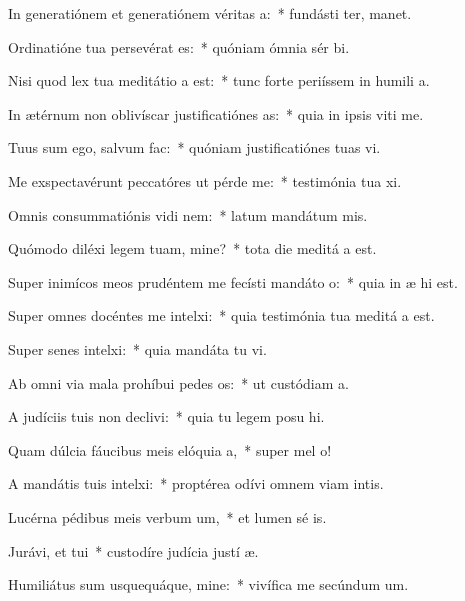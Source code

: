 \item In generatiónem et generatiónem véritas a:~* fundásti ter,  manet.
\item Ordinatióne tua persevérat es:~* quóniam ómnia sér bi.
\item Nisi quod lex tua meditátio a est:~* tunc forte periíssem in humili a.
\item In ætérnum non oblivíscar justificatiónes as:~* quia in ipsis viti me.
\item Tuus sum ego, salvum  fac:~* quóniam justificatiónes tuas vi.
\item Me exspectavérunt peccatóres ut pérde me:~* testimónia tua xi.
\item Omnis consummatiónis vidi nem:~* latum mandátum  mis.
\item Quómodo diléxi legem tuam, mine?~* tota die meditá a est.
\item Super inimícos meos prudéntem me fecísti mandáto o:~* quia in æ hi est.
\item Super omnes docéntes me intelxi:~* quia testimónia tua meditá a est.
\item Super senes intelxi:~* quia mandáta tu vi.
\item Ab omni via mala prohíbui pedes os:~* ut custódiam  a.
\item A judíciis tuis non declivi:~* quia tu legem posu hi.
\item Quam dúlcia fáucibus meis elóquia a,~* super mel  o!
\item A mandátis tuis intelxi:~* proptérea odívi omnem viam intis.
\item Lucérna pédibus meis verbum um,~* et lumen sé is.
\item Jurávi, et tui~* custodíre judícia justí æ.
\item Humiliátus sum usquequáque, mine:~* vivífica me secúndum  um.

